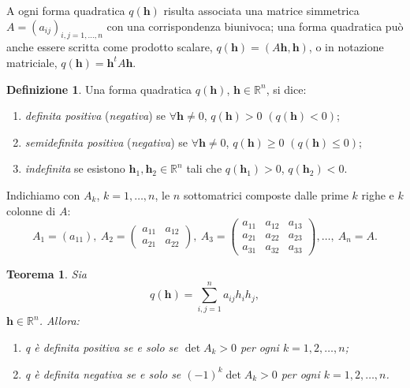 \documentclass[a4paper]{book}
\numberwithin{equation}{section}
\theoremstyle{plain}
\newtheorem{teor}{Teorema}[section]
\theoremstyle{definition}
\newtheorem{defn}{Definizione}[section]
\theoremstyle{remark}
\renewcommand{\vec}{\boldsymbol}
\theoremstyle{example}
\begin{document}
	A ogni forma quadratica $q(\vec{h})$ risulta associata una matrice simmetrica $A = (a_{ij})_{i,j = 1, \dots, n}$ con una corrispondenza biunivoca; una forma quadratica può anche essere scritta come prodotto scalare, $q(\vec{h}) = (A\vec{h}, \vec{h})$, o in notazione matriciale, $q(\vec{h}) = \vec{h}^tA\vec{h}$.

	\begin{defn}
		Una forma quadratica $q(\vec{h})$, $\vec{h} \in \mathbb{R}^n$, si dice:
		\begin{enumerate}
			\item \emph{definita positiva} (\emph{negativa}) se $\forall \vec{h} \ne 0$, $q(\vec{h}) > 0$ $(q(\vec{h}) < 0)$;
			\item \emph{semidefinita positiva} (\emph{negativa}) se $\forall \vec{h} \ne 0$, $q(\vec{h}) \ge 0$ $(q(\vec{h}) \le 0)$;
			\item \emph{indefinita} se esistono $\vec{h}_1, \vec{h}_2 \in \mathbb{R}^n$ tali che $q(\vec{h}_1) > 0$, $q(\vec{h}_2) < 0$.
		\end{enumerate}
	\end{defn}

	Indichiamo con $A_k$, $k = 1, \dots, n$, le $n$ sottomatrici composte dalle prime $k$ righe e $k$ colonne di $A$:
	\begin{equation*}
		A_1 = (a_{11}), \ A_2 = \begin{pmatrix} a_{11} & a_{12} \\ a_{21} & a_{22} \end{pmatrix}, \ A_3 = \begin{pmatrix} a_{11} & a_{12} & a_{13} \\ a_{21} & a_{22} & a_{23} \\ a_{31} & a_{32} & a_{33} \end{pmatrix}, \dots, \ A_n = A.
	\end{equation*}

	\begin{teor}
		Sia
		\begin{equation*}
			q(\vec{h}) = \sum_{i,j = 1}^n a_{ij}h_ih_j,
		\end{equation*}
		$\vec{h} \in \mathbb{R}^n$. Allora:
		\begin{enumerate}
			\item q è definita positiva se e solo se $\det{A_k} > 0$ per ogni $k = 1, 2, \dots, n$;
			\item q è definita negativa se e solo se $(-1)^k\det{A_k} > 0$ per ogni $k = 1, 2, \dots, n$.
		\end{enumerate}
	\end{teor}
\end{document}
